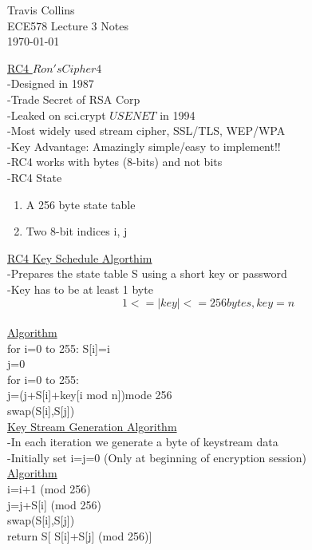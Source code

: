 \documentclass[12pt,letterpaper]{article}
\begin{document}
\linespread{1} %
\small \normalsize %
\begin{flushright}
Travis Collins \\
ECE578 Lecture 3 Notes \\
\today
\end{flushright}

\underline{RC4  \(Ron's  Cipher 4\)}\\
-Designed in 1987\\
-Trade Secret of RSA Corp\\
-Leaked on sci.crypt \(USENET\) in 1994\\
-Most widely used stream cipher, SSL/TLS, WEP/WPA\\
-Key Advantage: Amazingly simple/easy to implement!!\\
-RC4 works with bytes (8-bits) and not bits\\
-RC4 State
\begin{enumerate}\itemsep0.5pt
\item A 256 byte state table
\item Two 8-bit indices i, j
\end{enumerate}


\underline{RC4 Key Schedule Algorthim}\\
-Prepares the state table S using a short key or password\\
-Key has to be at least 1 byte \[1<=\left|{key}\right|<=256 bytes,key=n\]\\


\underline{Algorithm}\\
for i=0 to 255: S[i]=i\\
j=0\\
for i=0 to 255:\\
	j=(j+S[i]+key[i mod n])mode 256\\
	swap(S[i],S[j])\\

\underline{Key Stream Generation Algorithm}\\
-In each iteration we generate a byte of keystream data\\
-Initially set i=j=0 (Only at beginning of encryption session)\\

\underline{Algorithm}\\
i=i+1 (mod 256)\\
j=j+S[i] (mod 256) \\
swap(S[i],S[j])\\
return S[ S[i]+S[j] (mod 256)] \\
\end{document}
